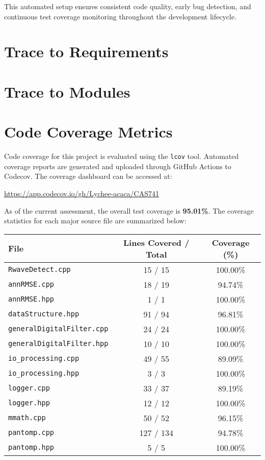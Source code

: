 \documentclass[12pt, titlepage]{article}
\begin{document}
This automated setup ensures consistent code quality, early bug detection, and
continuous test coverage monitoring throughout the development lifecycle.
		
\section{Trace to Requirements}
		
\section{Trace to Modules}		

\section{Code Coverage Metrics}

Code coverage for this project is evaluated using the \texttt{lcov} tool.
Automated coverage reports are generated and uploaded through GitHub Actions to
Codecov. The coverage dashboard can be accessed at:

\begin{center}
\url{https://app.codecov.io/gh/Lychee-acaca/CAS741}
\end{center}

As of the current assessment, the overall test coverage is \textbf{95.01\%}. The
coverage statistics for each major source file are summarized below:

\begin{center}
\begin{tabular}{|l|c|c|}
\hline
\textbf{File} & \textbf{Lines Covered / Total} & \textbf{Coverage (\%)} \\
\hline
\texttt{RwaveDetect.cpp}         & 15 / 15    & 100.00\% \\
\texttt{annRMSE.cpp}             & 18 / 19    & 94.74\%  \\
\texttt{annRMSE.hpp}             & 1 / 1      & 100.00\% \\
\texttt{dataStructure.hpp}       & 91 / 94    & 96.81\%  \\
\texttt{generalDigitalFilter.cpp}& 24 / 24    & 100.00\% \\
\texttt{generalDigitalFilter.hpp}& 10 / 10    & 100.00\% \\
\texttt{io\_processing.cpp}       & 49 / 55    & 89.09\%  \\
\texttt{io\_processing.hpp}       & 3 / 3      & 100.00\% \\
\texttt{logger.cpp}              & 33 / 37    & 89.19\%  \\
\texttt{logger.hpp}              & 12 / 12    & 100.00\% \\
\texttt{mmath.cpp}               & 50 / 52    & 96.15\%  \\
\texttt{pantomp.cpp}             & 127 / 134  & 94.78\%  \\
\texttt{pantomp.hpp}             & 5 / 5      & 100.00\% \\
\hline
\end{tabular}
\end{center}
\end{document}
